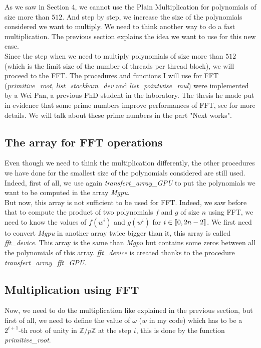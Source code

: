 As we saw in Section 4, we cannot use the Plain Multiplication for polynomials of size more than $512$. And step by step, we increase the size of the polynomials considered we want to multiply. We need to think another way to do a fast multiplication. The previous section explains the idea we want to use for this new case. \\

Since the step when we need to multiply polynomials of size more than $512$ (which is the limit size of the number of threads per thread block), we will proceed to the FFT. The procedures and functions I will use for FFT (\textit{primitive\_root}, \textit{list\_stockham\_dev} and \textit{list\_pointwise\_mul}) were implemented by a Wei Pan, a previous PhD student in the laboratory. The thesis he made put in evidence that some prime numbers improve performances of FFT, see \cite{Wei} for more details. We will talk about these prime numbers in the part "Next works". \\

\subsection{The array for FFT operations}

Even though we need to think the multiplication differently, the other procedures we have done for the smallest size of the polynomials considered are still used. Indeed, first of all, we use again \textit{transfert\_array\_GPU} to put the polynomials we want to be computed in the array \textit{Mgpu}. \\

But now, this array is not sufficient to be used for FFT. Indeed, we saw before that to compute the product of two polynomials $f$ and $g$ of size $n$ using FFT, we need to know the values of $f(w^i)$ and $g(w^i)$ for $i \in \mbox{\textlbrackdbl} 0, 2n-2\mbox{\textrbrackdbl}$. We first need to convert \textit{Mgpu} in another array twice bigger than it, this array is called \textit{fft\_device}. This array is the same than \textit{Mgpu} but contains some zeros between all the polynomials of this array. \textit{fft\_device} is created thanks to the procedure \textit{transfert\_array\_fft\_GPU}.

\subsection{Multiplication using FFT}
Now, we need to do the multiplication like explained in the previous section, but first of all, we need to define the value of $\omega$ ($w$ in my code) which has to be a $2^{i+1}$-th root of unity in $\mathbb{Z}/p\mathbb{Z}$ at the step $i$, this is done by the function \textit{primitive\_root}.\\

